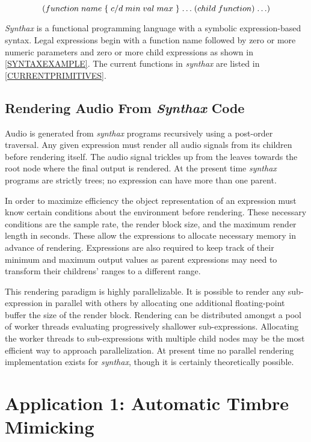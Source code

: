 \documentclass[12pt]{article}
\newcommand{\audiolanguagenamelower}{\emph{synthax}}
\newcommand{\audiolanguagenameupper}{\emph{Synthax}}
\begin{document}
\begin{equation}\label{SYNTAXEXAMPLE}
\sexp{({function} {name} \{{c/d} {min} {val} {max}\}\ldots ({child} {function})\ldots)}
\end{equation}

\audiolanguagenameupper{} is a functional programming language with a symbolic expression-based syntax. Legal expressions begin with a function name followed by zero or more numeric parameters and zero or more child expressions as shown in \ref{SYNTAXEXAMPLE}. The current functions in \audiolanguagenamelower{} are listed in \ref{CURRENTPRIMITIVES}.

\subsection{Rendering Audio From \audiolanguagenameupper{} Code}\label{RENDER}
Audio is generated from \audiolanguagenamelower{} programs recursively using a post-order traversal. Any given expression must render all audio signals from its children before rendering itself. The audio signal trickles up from the leaves towards the root node where the final output is rendered. At the present time \audiolanguagenamelower{} programs are strictly trees; no expression can have more than one parent.

In order to maximize efficiency the object representation of an expression must know certain conditions about the environment before rendering. These necessary conditions are the sample rate, the render block size, and the maximum render length in seconds. These allow the expressions to allocate necessary memory in advance of rendering. Expressions are also required to keep track of their minimum and maximum output values as parent expressions may need to transform their childrens' ranges to a different range.

This rendering paradigm is highly parallelizable. It is possible to render any sub-expression in parallel with others by allocating one additional floating-point buffer the size of the render block. Rendering can be distributed amongst a pool of worker threads evaluating progressively shallower sub-expressions. Allocating the worker threads to sub-expressions with multiple child nodes may be the most efficient way to approach parallelization. At present time no parallel rendering implementation exists for \audiolanguagenamelower, though it is certainly theoretically possible.




\section{Application 1: Automatic Timbre Mimicking}
\end{document}
